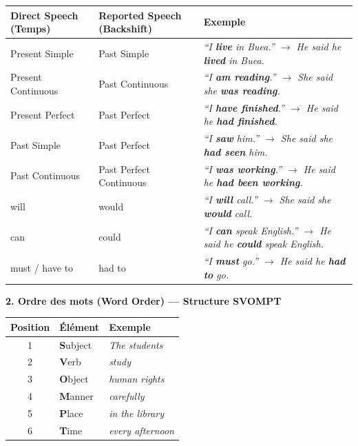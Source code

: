 \documentclass[11pt]{article}
\newcommand{\cle}[1]{{\popxbold\color{popdark}#1}}
\newcommand{\eng}[1]{\ifmmode\text{\textit{#1}}\else\begingroup\selectlanguage{english}\itshape #1\endgroup\fi}
\begin{document}
\begin{center}
\begin{tabularx}{\linewidth}{|X|X|X|}
\hline
\rowcolor{popblueL} \textbf{Direct Speech (Temps)} & \textbf{Reported Speech (Backshift)} & \textbf{Exemple} \\
\hline
Present Simple & Past Simple & \eng{``I \textbf{live} in Buea.''} $\to$ He said he \textbf{lived} in Buea. \\
Present Continuous & Past Continuous & \eng{``I \textbf{am reading}.''} $\to$ She said she \textbf{was reading}. \\
Present Perfect & Past Perfect & \eng{``I \textbf{have finished}.''} $\to$ He said he \textbf{had finished}. \\
Past Simple & Past Perfect & \eng{``I \textbf{saw} him.''} $\to$ She said she \textbf{had seen} him. \\
Past Continuous & Past Perfect Continuous & \eng{``I \textbf{was working}.''} $\to$ He said he \textbf{had been working}. \\
\cle{will} & \cle{would} & \eng{``I \textbf{will} call.''} $\to$ She said she \textbf{would} call. \\
\cle{can} & \cle{could} & \eng{``I \textbf{can} speak English.''} $\to$ He said he \textbf{could} speak English. \\
\cle{must} / \cle{have to} & \cle{had to} & \eng{``I \textbf{must} go.''} $\to$ He said he \textbf{had to} go. \\
\hline
\end{tabularx}
\end{center}

\textbf{2. Ordre des mots (Word Order) — Structure SVOMPT}

\begin{center}
\begin{tabularx}{\linewidth}{|c|X|X|}
\hline
\rowcolor{popblueL} \textbf{Position} & \textbf{Élément} & \textbf{Exemple} \\
\hline
1 & \textbf{S}ubject & \eng{The students} \\
2 & \textbf{V}erb & \eng{study} \\
3 & \textbf{O}bject & \eng{human rights} \\
4 & \textbf{M}anner & \eng{carefully} \\
5 & \textbf{P}lace & \eng{in the library} \\
6 & \textbf{T}ime & \eng{every afternoon} \\
\hline
\end{tabularx}
\end{center}
\end{document}
